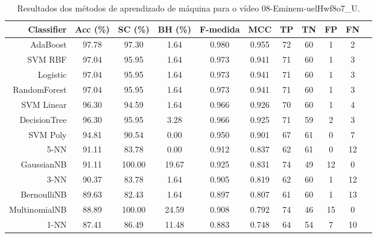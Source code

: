 \begin{table}[!htb]
\centering
\caption{Resultados dos métodos de aprendizado de máquina para o vídeo 08-Eminem-uelHwf8o7_U.}
\label{tab:08-Eminem-uelHwf8o7_U}
\begin{tabular}{r|c|c|c|c|c|c|c|c|c|c}
\hline\hline
Classifier & Acc (\%) & SC (\%) & BH (\%) & F-medida & MCC & TP & TN & FP & FN \\ \hline
AdaBoost & 97.78 & 97.30 & 1.64 & 0.980 & 0.955 & 72 & 60 & 1 & 2 \\ 
SVM RBF & 97.04 & 95.95 & 1.64 & 0.973 & 0.941 & 71 & 60 & 1 & 3 \\ 
Logistic & 97.04 & 95.95 & 1.64 & 0.973 & 0.941 & 71 & 60 & 1 & 3 \\ 
RandomForest & 97.04 & 95.95 & 1.64 & 0.973 & 0.941 & 71 & 60 & 1 & 3 \\ 
SVM Linear & 96.30 & 94.59 & 1.64 & 0.966 & 0.926 & 70 & 60 & 1 & 4 \\ 
DecisionTree & 96.30 & 95.95 & 3.28 & 0.966 & 0.925 & 71 & 59 & 2 & 3 \\ 
SVM Poly & 94.81 & 90.54 & 0.00 & 0.950 & 0.901 & 67 & 61 & 0 & 7 \\ 
5-NN & 91.11 & 83.78 & 0.00 & 0.912 & 0.837 & 62 & 61 & 0 & 12 \\ 
GaussianNB & 91.11 & 100.00 & 19.67 & 0.925 & 0.831 & 74 & 49 & 12 & 0 \\ 
3-NN & 90.37 & 83.78 & 1.64 & 0.905 & 0.819 & 62 & 60 & 1 & 12 \\ 
BernoulliNB & 89.63 & 82.43 & 1.64 & 0.897 & 0.807 & 61 & 60 & 1 & 13 \\ 
MultinomialNB & 88.89 & 100.00 & 24.59 & 0.908 & 0.792 & 74 & 46 & 15 & 0 \\ 
1-NN & 87.41 & 86.49 & 11.48 & 0.883 & 0.748 & 64 & 54 & 7 & 10 \\ 
\hline\hline
\end{tabular}
\end{table}
